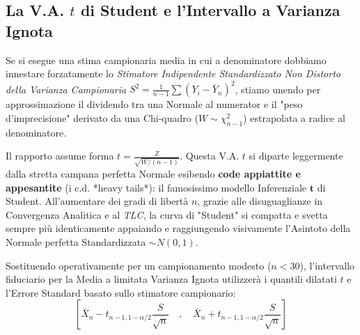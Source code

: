 \documentclass[12pt, a4paper]{article}
\begin{document}
\subsection{La V.A. $t$ di Student e l'Intervallo a Varianza Ignota}
Se si esegue una stima campionaria media in cui a denominatore dobbiamo innestare forzatamente lo \textit{Stimatore Indipendente Standardizzato Non Distorto della Varianza Campionaria} $S^2 = \frac{1}{n-1} \sum (Y_i - \bar{Y}_n)^2$, stiamo unendo per approssimazione il dividendo tra una Normale al numerator e il "peso d'imprecisione" derivato da una Chi-quadro ($W \sim \chi^2_{n-1}$) estrapolata a radice al denominatore.

Il rapporto assume forma $t = \frac{Z}{\sqrt{W/(n-1)}}$. 
Questa V.A. $t$ si diparte leggermente dalla stretta campana perfetta Normale esibendo \textbf{code appiattite e appesantite} (i c.d. *heavy tails*): il famosissimo modello Inferenziale $\boldsymbol{t}$ di Student. 
All'aumentare dei gradi di libertà $n$, grazie alle disuguaglianze in Convergenza Analitica e al \textit{TLC}, la curva di "Student" si compatta e svetta sempre più identicamente appaiando e raggiungendo visivamente l'Asintoto della Normale perfetta Standardizzata $\sim N(0,1)$.

Sostituendo operativamente per un campionamento modesto ($n < 30$), l'intervallo fiduciario per la Media a limitata Varianza Ignota utilizzerà i quantili dilatati $t$ e l'Errore Standard basato sullo stimatore campionario:
$$ \left[ \bar{X}_n - t_{n-1, 1-\alpha/2} \frac{S}{\sqrt{n}} \quad , \quad \bar{X}_n + t_{n-1, 1-\alpha/2} \frac{S}{\sqrt{n}} \right] $$
\end{document}
